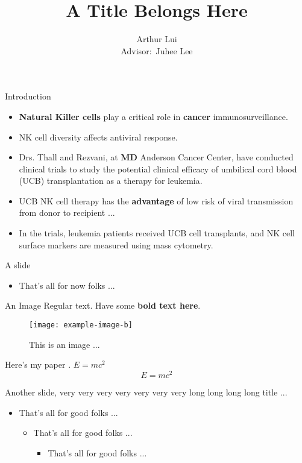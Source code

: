 \documentclass[]{beamer}
\title[short title]{A Title Belongs Here}
\author[A. Lui]{Arthur Lui \\ {\small Advisor$\colon$ Juhee Lee}}
\institute{Department of Statistics\\ UC Santa Cruz}
\begin{document}

\begin{frame}{Introduction}
  \begin{itemize}
    \setlength\itemsep{1em}

    \item
      \textbf{Natural Killer cells} play a critical role in \textbf{cancer} immunosurveillance.
    \item NK cell diversity affects antiviral response.
    \item Drs. Thall and Rezvani, at \textbf{MD} Anderson Cancer
      Center, have conducted clinical trials to study the potential clinical
      efficacy of umbilical cord blood (UCB) transplantation as a therapy for
      leukemia.
    \item UCB NK cell therapy has the \textbf{advantage} of low risk of viral
      transmission from donor to recipient ...
    \item In the trials, leukemia patients received UCB cell transplants, and
      NK cell surface markers are measured using mass cytometry.
  \end{itemize}
\end{frame}

\begin{frame}{A slide}
  \begin{itemize}
    \item That's all for now folks ...
  \end{itemize}
\end{frame}

\begin{frame}{An Image}
  Regular text.
  Have some \textbf{bold text here}.
  \begin{figure}
    \centering
    \texttt{[image: example-image-b]}
    \caption{This is an image ...}
  \end{figure}
  Here's my paper \citep{lui2020bayesian}.  $E = mc^2$
  $$ E = mc^2 $$
\end{frame}

\begin{frame}{Another slide, very very very very very very very 
  long long long long title ...}
  \begin{itemize}
    \item That's all for good folks ...
      \begin{itemize}
        \item That's all for good folks ...
          \begin{itemize}
            \item That's all for good folks ...
          \end{itemize}
      \end{itemize}
  \end{itemize}
\end{frame}
\end{document}
